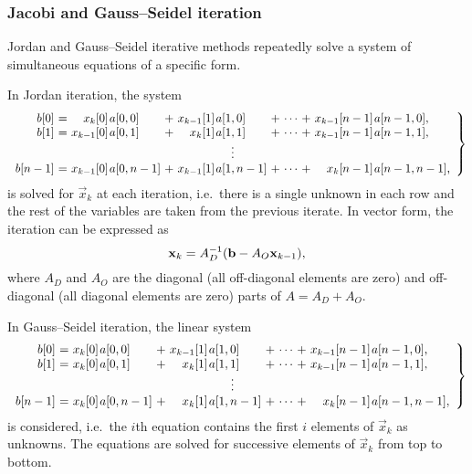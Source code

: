 \subsubsection{Jacobi and Gauss--Seidel iteration}

Jordan and Gauss--Seidel iterative methods repeatedly solve a system
of simultaneous equations of a specific form.

In Jordan iteration, the system
{\small\begin{equation} \left.
      \begin{array}{r@{${} = {}$}*{2}{r@{\kern1pt}l@{${} + {}$}}c@{${} + {}$}r@{\kern1pt}l}
        b[0] & x_{k}[0] & a[0,0] & x_{k - 1}[1] & a[1,0] & \cdots & x_{k - 1}[n - 1] & a[n - 1,0] \text,\\
        b[1] & x_{k - 1}[0] & a[0,1] & x_{k}[1] & a[1,1] & \cdots & x_{k - 1}[n - 1] & a[n - 1,1] \text,\\
        \multicolumn{8}{c}{$\vdots$} \\
        b[n - 1] & x_{k - 1}[0] & a[0,n - 1] & x_{k - 1}[1] & a[1,n - 1] & \cdots & x_{k}[n - 1] & a[n - 1,n - 1] \text,\\
      \end{array}
    \right\}
  \end{equation}}%
is solved for $\vec{x}_{k}$ at each iteration, i.e.~there is a
single unknown in each row and the rest of the variables are taken
from the previous iterate. In vector form, the iteration can be
expressed as
\begin{equation}
  \vec{x}_{k} = A_D^{-1} (\vec{b} - A_O \vec{x}_{k - 1}) \text,
\end{equation}
where $A_D$ and $A_O$ are the diagonal (all off-diagonal elements are
zero) and off-diagonal (all diagonal elements are zero) parts of $A =
A_D + A_O$.

In Gauss--Seidel iteration, the linear system
{\small\begin{equation}
    \left.
      \begin{array}{r@{${} = {}$}*{2}{r@{\kern1pt}l@{${} + {}$}}c@{${} + {}$}r@{\kern1pt}l}
        b[0] & x_{k}[0] & a[0,0] & x_{k - 1}[1] & a[1,0] & \cdots & x_{k - 1}[n - 1] & a[n - 1,0] \text,\\
        b[1] & x_{k}[0] & a[0,1] & x_{k}[1] & a[1,1] & \cdots & x_{k - 1}[n - 1] & a[n - 1,1] \text,\\
        \multicolumn{8}{c}{$\vdots$} \\
        b[n - 1] & x_{k}[0] & a[0,n - 1] & x_{k}[1] & a[1,n - 1] & \cdots & x_{k}[n - 1] & a[n - 1,n - 1] \text,\\
      \end{array}
    \right\}
  \end{equation}}%
is considered, i.e.~the $i$th equation contains the first $i$ elements
of $\vec{x}_k$ as unknowns. The equations are solved for successive
elements of $\vec{x}_k$ from top to bottom.

